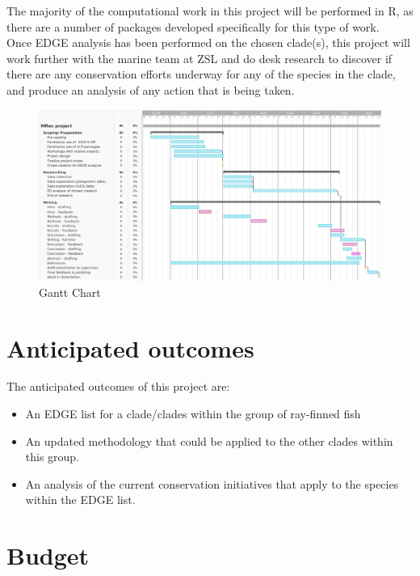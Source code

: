 \documentclass[11pt]{article}
\begin{document}
The majority of the computational work in this project will be performed in R, as there are a number of packages developed specifically for this type of work. \\ 

Once EDGE analysis has been performed on the chosen clade(s), this project will work further with the marine team at ZSL and do desk research to discover if there are any conservation efforts underway for any of the species in the clade, and produce an analysis of any action that is being taken. 

	
\begin{figure}[h!]
	
	\includegraphics[width = \linewidth]{Images/Gantt_Image.png}
	\caption{	Gantt Chart}
	\label{MRes Gantt}
	
\end{figure}

\newpage

	
	\section{Anticipated outcomes}
	\noindent
	
	The anticipated outcomes of this project are:
	\begin{itemize}
	 \item An EDGE list for a clade/clades within the group of ray-finned fish
	 \item An updated methodology that could be applied to the other clades within this group. 
	 \item An analysis of the current conservation initiatives that apply to the species within the EDGE list. 
	\end{itemize}
	
	
	\section{Budget}
	\noindent
	
\end{document}

